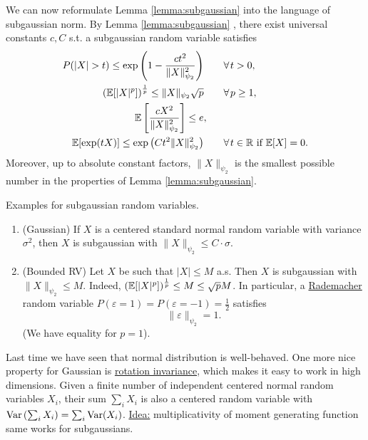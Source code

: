 \begin{definition}
\begin{remark*}
We can now reformulate Lemma \ref{lemma:subgaussian} into the language of subgaussian norm. By Lemma  \ref{lemma:subgaussian} , there exist universal constants $c,C$ s.t. a subgaussian random variable satisfies
\begin{align}
P(|X|>t) \leq \exp \left(
1-\frac{ct^2}{\|X\|_{\psi_2}^2}
\right)& \quad \quad \forall t>0,	\\ \label{eq:subgaussian-alter-2}
\left(\E[|X|^p]\right)^{\frac{1}{p}} \leq \|X\|_{\psi_2} \sqrt{p}& \quad \quad \forall p \geq 1,\\
\E\left[
\frac{cX^2}{\|X\|_{\psi_2}^2} 
\right] \leq e	&, \\
\E[\exp(tX)] \leq \exp \left(
Ct^2 \|X\|_{\psi_2}^2
\right) & \quad \quad \forall t\in \R \text{ if } \E[X]=0.
\end{align}
Moreover, up to absolute constant factors, $\|X\|_{\psi_2}$ is the smallest possible number in the properties of Lemma \ref{lemma:subgaussian}.
\end{remark*}\vspace{-1.5pc}
\end{definition} 
\begin{example*}Examples for subgaussian random variables. \vspace{-0.5pc}
\begin{enumerate}
\item (Gaussian) If $X$ is a centered standard normal random variable with variance $\sigma^2$, then $X$ is subgaussian with $\|X\|_{\psi_2} \leq C\cdot \sigma$. 
\item (Bounded RV) Let $X$ be such that $|X|\leq M$ a.s. Then $X$ is subgaussian with $\|X\|_{\psi_2} \leq M$. Indeed, $(\mathbb{E}[|X|^p])^{\frac{1}{p}} \leq M \leq \sqrt{p} M$. In particular, a \underline{Rademacher} random variable $P(\varepsilon =1) = P(\varepsilon = -1) =\frac{1}{2}$ satisfies
$$
\|\varepsilon\|_{\psi_2} = 1.
$$
(We have equality for $p=1$).
\end{enumerate}
\end{example*}
Last time we have seen that normal distribution is well-behaved. One more nice property for Gaussian is \underline{rotation invariance}, which makes it easy to work in high dimensions. Given a finite number of independent centered normal random variables $X_i$,  their sum $\sum_i X_i$ is also a centered random variable with $\operatorname{Var}\left(\sum_i X_i\right) = \sum_i \operatorname{Var}(X_i)$. \underline{Idea:} multiplicativity of moment generating function same works for subgaussians.

